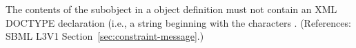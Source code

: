 The contents of the \Message subobject in a \Constraint object definition
must not contain an XML DOCTYPE declaration (i.e., a string beginning with
the characters .  (References: SBML L3V1
Section~\ref{sec:constraint-message}.)
